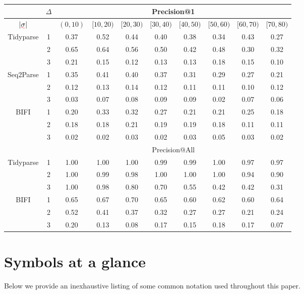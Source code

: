 \documentclass[sigplan,acmsmall,nonacm,screen]{acmart}\settopmatter{printfolios=false,printccs=false,printacmref=false}
\begin{document}
\begin{table}[!h]
\centering
\begin{tabular}{c|c|cccccccc}
\hline\hline
& $\Delta$ & \multicolumn{8}{c}{Precision@1} \\ \hline
$|\err\sigma|$ &  & $(0,10)$ & $[10,20)$ & $[20,30)$ & $[30, 40)$ & $[40,50)$ & $[50, 60)$ & $[60,70)$ & $[70, 80)$ \\ \hline
Tidyparse
& 1 & 0.37 & 0.52 & 0.44 & 0.40 & 0.38 & 0.34 & 0.43 & 0.27 \\
& 2 & 0.65 & 0.64 & 0.56 & 0.50 & 0.42 & 0.48 & 0.30 & 0.32 \\
& 3 & 0.21 & 0.15 & 0.12 & 0.13 & 0.13 & 0.18 & 0.15 & 0.10 \\ \hline
Seq2Parse
& 1 & 0.35 & 0.41 & 0.40 & 0.37 & 0.31 & 0.29 & 0.27 & 0.21 \\
& 2 & 0.12 & 0.13 & 0.14 & 0.12 & 0.11 & 0.11 & 0.10 & 0.12 \\
& 3 & 0.03 & 0.07 & 0.08 & 0.09 & 0.09 & 0.02 & 0.07 & 0.06 \\ \hline
BIFI
& 1 & 0.20 & 0.33 & 0.32 & 0.27 & 0.21 & 0.21 & 0.25 & 0.18 \\
& 2 & 0.18 & 0.18 & 0.21 & 0.19 & 0.19 & 0.18 & 0.11 & 0.11 \\
& 3 & 0.02 & 0.02 & 0.03 & 0.02 & 0.03 & 0.05 & 0.03 & 0.02 \\ \hline
& & \multicolumn{8}{c}{Precision@All} \\ \hline
Tidyparse
& 1 & 1.00 & 1.00 & 1.00 & 0.99 & 0.99 & 1.00 & 0.97 & 0.97 \\
& 2 & 1.00 & 0.99 & 0.98 & 1.00 & 1.00 & 1.00 & 0.94 & 0.90 \\
& 3 & 1.00 & 0.98 & 0.80 & 0.70 & 0.55 & 0.42 & 0.42 & 0.31 \\ \hline
BIFI
& 1 & 0.65 & 0.67 & 0.70 & 0.65 & 0.60 & 0.62 & 0.60 & 0.64 \\
& 2 & 0.52 & 0.41 & 0.37 & 0.32 & 0.27 & 0.27 & 0.21 & 0.24 \\
& 3 & 0.20 & 0.13 & 0.08 & 0.17 & 0.15 & 0.18 & 0.17 & 0.07 \\ \hline\hline
\end{tabular}
\end{table}

\section{Symbols at a glance}

Below we provide an inexhaustive listing of some common notation used throughout this paper.
\end{document}
